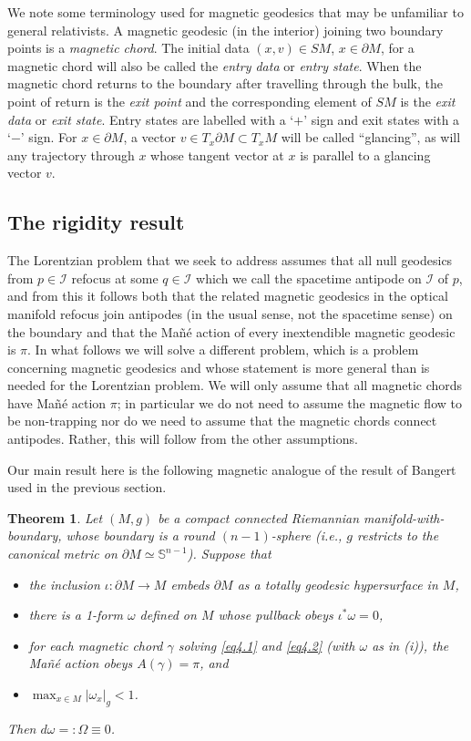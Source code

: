 \documentclass[12pt]{amsart}
\numberwithin{equation}{section}
\newtheorem{theorem}{Theorem}[section]
\begin{document}
We note some terminology used for magnetic geodesics that may be unfamiliar to general relativists. A magnetic geodesic (in the interior) joining two boundary points is a \emph{magnetic chord}. The initial data $(x,v)\in SM$, $x\in \partial M$, for a magnetic chord will also be called the \emph{entry data} or \emph{entry state}. When the magnetic chord returns to the boundary after travelling through the bulk, the point of return is the \emph{exit point} and the corresponding element of $SM$ is the \emph{exit data} or \emph{exit state}. Entry states are labelled with a `$+$' sign and exit states with a `$-$' sign. For $x \in \partial M$, a vector $v\in T_x \partial M\subset T_xM$ will be called ``glancing'', as will any trajectory through $x$ whose tangent vector at $x$ is parallel to a glancing vector $v$.

\subsection{The rigidity result}\label{section4.2}
The Lorentzian problem that we seek to address assumes that all null geodesics from $p\in{\mathcal I}$ refocus at some $q\in{\mathcal I}$ which we call the spacetime antipode on ${\mathcal I}$ of $p$, and from this it follows both that the related magnetic geodesics in the optical manifold refocus join antipodes (in the usual sense, not the spacetime sense) on the boundary and that the Ma\~n\'e action of every inextendible magnetic geodesic is $\pi$. In what follows we will solve a different problem, which is a problem concerning magnetic geodesics and whose statement is more general than is needed for the Lorentzian problem. We will only assume that all magnetic chords have Ma\~n\'e action $\pi$; in particular we do not need to assume the magnetic flow to be non-trapping nor do we need to assume that the magnetic chords connect antipodes. Rather, this will follow from the other assumptions.

Our main result here is the following magnetic analogue of the result of Bangert \cite{Bangert} used in the previous section.

\begin{theorem} \label{theorem4.1}
Let $(M,g)$ be a compact connected Riemannian manifold-with-boundary, whose boundary is a round $(n-1)$-sphere (i.e., $g$ restricts to the canonical metric on $\partial M\simeq {\mathbb S}^{n-1}$). Suppose that
\begin{itemize}
\item [i)] the inclusion $\iota:\partial M\to M$ embeds $\partial M$ as a totally geodesic hypersurface in $M$,
\item [ii)] there is a 1-form $\omega$ defined on $M$ whose pullback obeys $\iota^*\omega=0$,
\item [iii)] for each magnetic chord $\gamma$ solving \eqref{eq4.1} and \eqref{eq4.2} (with $\omega$ as in (i)), the Ma\~n\'e action obeys $A(\gamma)=\pi$, and
\item [iv)] $\max_{x\in M}|\omega_{x}|_{g}<1$.
\end{itemize}
Then $d\omega =: \Omega \equiv 0$.\label{thm:MagBangert}
\end{theorem}
\end{document}
